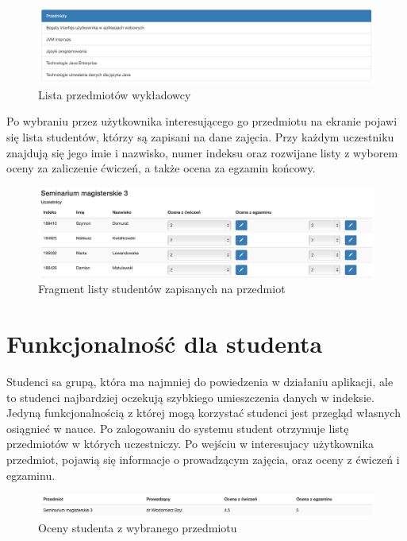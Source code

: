 \documentclass[brudnopis]{xmgr}
\begin{document}
\begin{figure}[th!]
\centering
\includegraphics[width=0.7\hsize]{images/subjectList} 
\caption{Lista przedmiotów wykładowcy\label{RYS.10}}
\end{figure}

Po wybraniu przez użytkownika interesującego go przedmiotu na ekranie pojawi się lista studentów,  którzy są zapisani na dane zajęcia. Przy każdym uczestniku znajdują się jego imie i nazwisko, numer indeksu oraz rozwijane listy z wyborem oceny za zaliczenie ćwiczeń, a także ocena za egzamin końcowy.

\begin{figure}[th!]
\centering
\includegraphics[width=0.7\hsize]{images/studentList} 
\caption{Fragment listy studentów zapisanych na przedmiot\label{RYS.11}}
\end{figure}

\section{Funkcjonalność dla studenta}
Studenci sa grupą, która ma najmniej do powiedzenia w działaniu aplikacji, ale to studenci najbardziej oczekują szybkiego umieszczenia danych w indeksie. Jedyną funkcjonalnością z której mogą korzystać studenci jest przegląd własnych osiągnieć w nauce. Po zalogowaniu do systemu student otrzymuje listę przedmiotów w których uczestniczy. Po wejściu w interesujacy użytkownika przedmiot, pojawią się informacje o prowadzącym zajęcia, oraz oceny z ćwiczeń i egzaminu.

\begin{figure}[th!]
\centering
\includegraphics[width=0.7\hsize]{images/studentGrade} 
\caption{Oceny studenta z wybranego przedmiotu\label{RYS.12}}
\end{figure}
\end{document}
